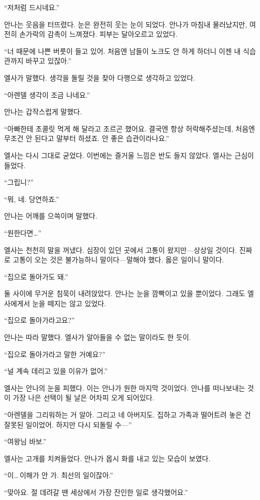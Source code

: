``저처럼 드시네요.''

안나는 웃음을 터뜨렸다. 눈은 완전히 웃는 눈이 되었다. 안나가 마침내 물러났지만, 여전히 손가락의 감촉이 느껴졌다. 피부는 달아오르고 있었다.

``너 때문에 나쁜 버릇이 들고 있어. 처음엔 남들이 노크도 안 하게 하더니 이젠 내 식습관까지 바꾸고 있잖아.''

엘사가 말했다. 생각을 돌릴 것을 찾아 다행으로 생각하고 있었다.

``아렌델 생각이 조금 나네요.''

안나는 갑작스럽게 말했다.

``아빠한테 초콜릿 먹게 해 달라고 조르곤 했어요. 결국엔 항상 허락해주셨는데, 처음엔 무조건 안 된다고 말부터 하셨죠. 안 좋은 습관이라나요.''

엘사는 다시 그대로 굳었다. 이번에는 즐거울 느낌은 반도 들지 않았다. 엘사는 근심이 들었다.

`` 그립니?''

``뭐, 네. 당연하죠.''

안나는 어깨를 으쓱이며 말했다.

``원한다면\ldots''

엘사는 천천히 말을 꺼냈다. 심장이 있던 곳에서 고통이 왔지만—상상일 것이다. 진짜로 고통이 오는 것은 불가능하니 말이다—말해야 했다. 옳은 일이니 말이다.

``집으로 돌아가도 돼.''

둘 사이에 무거운 침묵이 내려앉았다. 안나는 눈을 깜빡이고 있을 뿐이었다. 그래도 엘사에게서 눈을 떼지는 않고 있었다.

``집으로 돌아가라고요?''

안나는 따라 말했다. 엘사가 알아들을 수 없는 말이라도 한 듯이.

``집으로 돌아가라고 말한 거예요?''

``널 계속 데리고 있을 이유가 없어.''

엘사는 안나의 눈을 피했다. 이는 안나가 원한 마지막 것이었다. 안나를 떠나보내는 것이 가장 나은 선택이 될 날은 어차피 오게 되어있다.

``아렌델을 그리워하는 거 알아. 그리고 네 아버지도. 집하고 가족과 떨어트려 놓은 건 잘못된 일이었어. 하지만 다시 되돌릴 수—''

``여왕님 바보.''

엘사는 고개를 치켜들었다. 안나가 몹시 화를 내고 있는 모습이 보였다.

``이\ldots\,이해가 안 가. 최선의 일이잖아.''

``맞아요. 절 데려갈 땐 세상에서 가장 잔인한 일로 생각했어요.''

